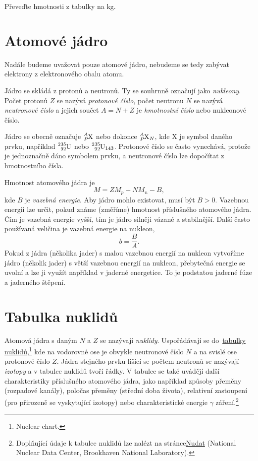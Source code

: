 \documentclass[a4paper,12pt,oneside]{article}
\theoremstyle{red}
\begin{document}
\begin{task}
    Převeďte hmotnosti z tabulky na kg.
\end{task}

\section{Atomové jádro}
    Nadále budeme uvažovat pouze atomové jádro, nebudeme se tedy zabývat elektrony z elektronového obalu atomu.

    Jádro se skládá z protonů a neutronů. Ty se souhrnně označují jako \emph{nukleony}.
    Počet protonů $Z$ se nazývá \emph{protonové číslo},
    počet neutronu $N$ se nazývá \emph{neutronové číslo}
    a jejich součet $A=N+Z$ je \emph{hmotnostní číslo} nebo nukleonové číslo.

    Jádro se obecně označuje $\ce{^{\it A}_{\it P}X}$ nebo dokonce $\ce{^{\it A}_{\it P}X_{\it N}}$, kde X je symbol daného prvku, například $\ce{^{235}_{92}U}$ nebo $\ce{^{235}_{92}U_{143}}$.
    Protonové číslo se často vynechává, protože je jednoznačně dáno symbolem prvku, a neutronové číslo lze dopočítat z hmotnostního čísla.

    Hmotnost atomového jádra je
    \begin{equation}
        M=ZM_{p}+NM_{n}-B,
    \end{equation}
    kde $B$ je \emph{vazebná energie}.
    Aby jádro mohlo existovat, musí být $B>0$.
    Vazebnou energii lze určit, pokud známe (změříme) hmotnost příslušného atomového jádra.
    Čím je vazebná energie vyšší, tím je jádro silněji vázané a stabilnější.
    Další často používaná veličina je vazebná energie na nukleon,
    \begin{equation}
        b=\frac{B}{A}.
    \end{equation}
    Pokud z jádra (několika jader) s malou vazebnou energií na nukleon vytvoříme jádro (několik jader) s větší vazebnou energií na nukleon, přebytečná energie se uvolní a lze ji využít například v jaderné energetice.
    To je podstatou jaderné fúze a jaderného štěpení.

\section{Tabulka nuklidů}
    Atomová jádra s daným $N$ a $Z$ se nazývají \emph{nuklidy}.
    Uspořádávají se do~\href{https://upload.wikimedia.org/wikipedia/commons/b/b5/NuclideMap_stitched.png}{tabulky nuklidů},\footnote{Nuclear chart.} kde na vodorovné ose je obvykle neutronové číslo $N$ a na svislé ose protonové číslo $Z$.
    Jádra stejného prvku lišící se počtem neutronů se nazývají \emph{izotopy} a v tabulce nuklidů tvoří řádky.
    V tabulce se také uvádějí další charakteristiky příslušného atomového jádra, jako například způsoby přeměny (rozpadové kanály), poločas přeměny (střední doba života), relativní zastoupení (pro přirozeně se vyskytující izotopy) nebo charakteristické energie $\gamma$ záření.\footnote{
        Doplňující údaje k tabulce nuklidů lze nalézt na stránce\href{https://www.nndc.bnl.gov/nudat3/}{Nudat} (National Nuclear Data Center, Brookhaven National Laboratory).
    }
\end{document}
